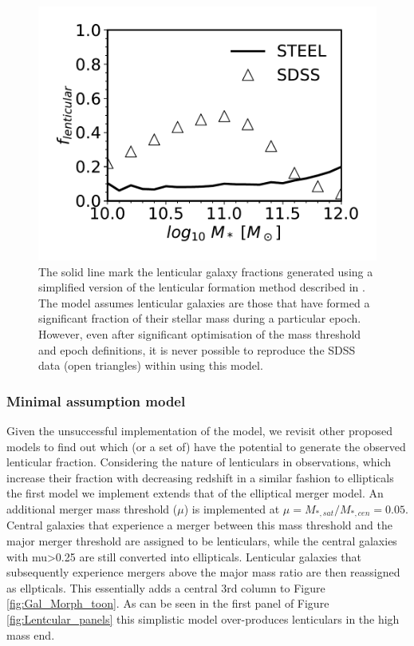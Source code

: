 \begin{figure}
  \includegraphics[width=\linewidth]{Figures/Chapter5/CookModel.pdf}
    \caption{The solid line mark the lenticular galaxy fractions generated using a simplified version of the lenticular formation method described in
    \cite{Cook2009Two-phaseFormation}. The model assumes lenticular galaxies are those that have formed a significant fraction of their stellar mass during a particular epoch. However, even after significant optimisation of the mass
    threshold and epoch definitions, it is never possible to reproduce the SDSS
    data (open triangles) within \steel using this model.}
    \label{fig:CookeModel}
\end{figure}

\subsubsection{Minimal assumption model}

Given the unsuccessful implementation of the \citet{Cook2009Two-phaseFormation} model, we revisit other proposed models to find out which (or a set of) have the potential to generate the observed lenticular fraction. Considering the nature of lenticulars in observations, which increase their fraction with decreasing redshift in a similar fashion to ellipticals \cite{Huertas-Company2015TheGrowth,Huertas-Company2016MassCANDELS} the first model we implement extends that of the elliptical merger model. An additional merger mass threshold ($\mu$) is implemented at $\mu = M_{*, sat}/M_{*, cen} = 0.05$. Central galaxies that experience a merger between this mass threshold and the major merger threshold are assigned to be lenticulars, while the central galaxies with mu>0.25 are still converted into ellipticals. Lenticular galaxies that subsequently experience mergers above the major mass ratio are then reassigned as ellpticals. This essentially adds a central 3rd column to Figure \ref{fig:Gal_Morph_toon}. As can be seen in the first panel of Figure \ref{fig:Lentcular_panels} this simplistic model over-produces lenticulars in the high mass end. 

